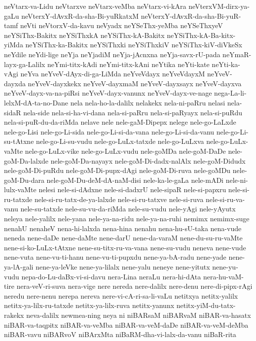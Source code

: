{neVtarx-va-Lidu
neVtarxve
neVtarx-veMba
neVtarx-vi-kAra
neVterxVM-dirx-ya-gaLu
neVterxY-dAvxR-da-sha-Bi-yuRkatxM
neVterxY-dAvxR-da-sha-Bi-yuR-tamf
neVti
neVtorxV-da-kavu
neVyadx
neYSeThx-yeMba
neYSeThxyeV
neYSiThx-Bakitx
neYSiThxkA
neYSiThx-kA-Bakitx
neYSiThx-kA-Ba-kitx-yiMda
neYSiThx-ka-Bakitx
neYSiThxki
neYSiThxkiV
neYSiThx-kiV-diVkeSx
neYdile
neYdi-lige
neYja
neYjadiM
neYja-jAcnxna
neYja-savx-rU-pada
neYmaR-layx-ga-Lalilx
neYmi-titx-kAdi
neYmi-titx-kAni
neYtika
neYti-kate
neYti-ka-vAgi
neYva
neYveV-dAyx-di-ga-LiMda
neYveVdayx
neYveVdayxM
neYveV-dayxda
neYveV-dayxkekx
neYveV-dayxmaM
neYveV-dayxsayx
neYveV-dayxva
neYveV-dayx-va-na-piRsi
neYveV-dayx-vanunx
neYveV-dayx-ve-nage
nega-La-li-lelxM-dA-ta-no-Dane
nela
nela-ho-la-dalilx
nelakekx
nela-ni-paRru
nelasi
nela-sidaR
nela-side
nela-si-ha-vi-dana
nela-si-paRru
nela-si-paRyayx
nela-si-puRdu
nela-si-puR-du-da-riMda
nelave
nele
nele-gaM-Dipepx
nelege
nele-go-LaLxde
nele-go-Lisi
nele-go-Li-sida
nele-go-Li-si-da-vana
nele-go-Li-si-da-vanu
nele-go-Li-su-tAtxne
nele-go-Li-su-vudu
nele-go-LuLx-tatxde
nele-go-LuLxva
nele-go-LuLx-vaMte
nele-go-LuLx-vike
nele-go-LuLx-vudu
nele-goMDa
nele-goM-DaDe
nele-goM-Da-lalxde
nele-goM-Da-nayayx
nele-goM-Di-dadx-nalAlx
nele-goM-Didudx
nele-goM-Di-puRdu
nele-goM-Di-pupx-dAgi
nele-goM-Di-ruva
nele-goMDu
nele-goM-Du-dara
nele-goM-Du-deM-dA-naM-disi
nele-ka-le-gaLa
nele-mADi
nele-ni-lulx-vaMte
nelesi
nele-si-dAdxne
nele-si-dadxrU
nele-sipaR
nele-si-papxru
nele-si-ru-tatxde
nele-si-ru-tatx-de-ya-lalxde
nele-si-ru-tatxve
nele-si-ruva
nele-si-ru-va-vanu
nele-su-tatxde
nele-su-vu-da-riMda
nele-su-vudu
nele-yAgi
nele-yAyutx
neleya
nele-yalilx
nele-yana
nele-ya-na-ridu
nele-ya-na-ruhi
nemimx
nemimx-suge
nenahU
nenaheV
nena-hi-lalxda
nena-hina
nenahu
nena-hu-sU-taka
nena-vude
neneda
nene-daDe
nene-daMte
nene-darU
nene-da-varaM
nene-du-su-ru-vaMte
nene-si-ko-LuLx-tAtxne
nene-su-titx-ru-va-vana
nene-su-vudu
neneva
nene-vude
nene-vuta
nene-vu-ti-hanu
nene-vu-ti-pupxdu
nene-ya-bA-radu
nene-yade
nene-ya-lA-gali
nene-ya-leVke
nene-ya-lilalx
nene-yalu
neneye
nene-yitutx
nene-yu-vudu
nepa-do-Lu-daBx-vi-si-davu
nera-Lina
neraLu
nera-hi-dAta
nera-hu-vaM-tire
nera-veV-ri-suva
nera-vige
nere
nereda
nere-dalilx
nere-denu
nere-di-pipx-rAgi
neredu
nere-nenu
nerepa
nereva
nere-vi-cA-ri-sa-li-vaLu
netitxya
netitx-yalilx
netitx-ya-lilx-ru-tatxde
netitx-ya-lilx-ruva
netitx-yanunx
netitx-yiM-du-tatx-rakekx
neva-dalilx
newmea-ning
neya
ni
niBARsaM
niBARvaM
niBAR-va-hasatx
niBAR-va-taqpitx
niBAR-va-veMba
niBAR-va-veM-daDe
niBAR-va-veM-deMba
niBAR-vavu
niBARvoV
niBArxMta
niBaRM-dha-vi-lalx-da-vanu
niBaR-rita
}
